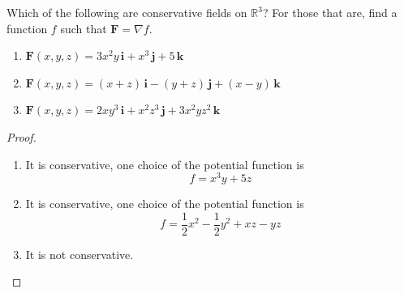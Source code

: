 \documentclass[openany]{book}
\begin{document}
\begin{prob}[20]
    Which of the following are conservative fields on \( \mathbb{R}^3 \)?  
    For those that are, find a function \( f \) such that \( \mathbf{F} = \nabla f \).  

    \begin{enumerate}
        \item[(a)] \( \mathbf{F}(x, y, z) = 3x^2 y \, \mathbf{i} + x^3 \, \mathbf{j} + 5 \, \mathbf{k} \)
        \item[(b)] \( \mathbf{F}(x, y, z) = (x + z) \, \mathbf{i} - (y + z) \, \mathbf{j} + (x - y) \, \mathbf{k} \)
        \item[(c)] \( \mathbf{F}(x, y, z) = 2xy^3 \, \mathbf{i} + x^2 z^3 \, \mathbf{j} + 3x^2 y z^2 \, \mathbf{k} \)
    \end{enumerate}
\end{prob}
\begin{proof}
    \begin{enumerate}
        \item[(a)] It is conservative, one choice of the potential function is
        \begin{equation*}
            f=x^3y+5z
        \end{equation*}
        \item[(b)] It is conservative, one choice of the potential function is 
        \begin{equation*}
            f=\frac{1}{2}x^2-\frac{1}{2}y^2+xz-yz
        \end{equation*}
        \item[(c)] It is not conservative.
    \end{enumerate}
\end{proof}
\end{document}
